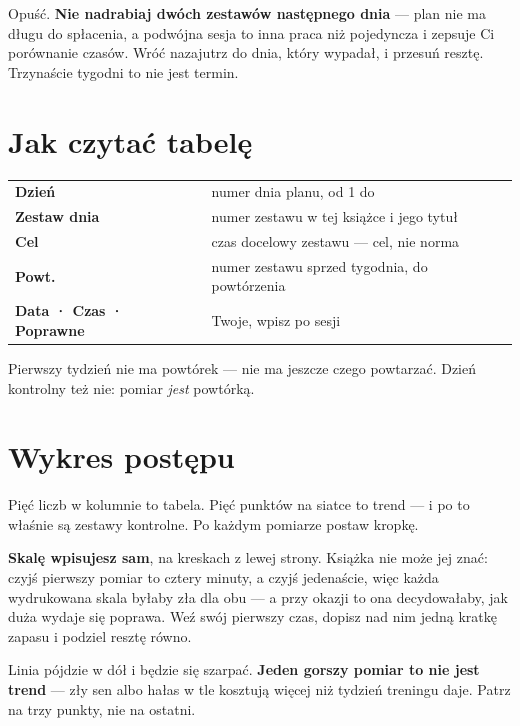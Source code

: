 Opuść. \textbf{Nie nadrabiaj dwóch zestawów następnego dnia} — plan nie ma
długu do spłacenia, a podwójna sesja to inna praca niż pojedyncza i zepsuje
Ci porównanie czasów. Wróć nazajutrz do dnia, który wypadał, i przesuń resztę.
Trzynaście tygodni to nie jest termin.

\section*{Jak czytać tabelę}

\begin{center}\footnotesize
\begin{tabular}{@{}ll@{}}
  \textbf{Dzień} & numer dnia planu, od 1 do \btplandni{} \\
  \textbf{Zestaw dnia} & numer zestawu w tej książce i jego tytuł \\
  \textbf{Cel} & czas docelowy zestawu — cel, nie norma \\
  \textbf{Powt.} & numer zestawu sprzed tygodnia, do powtórzenia \\
  \textbf{Data · Czas · Poprawne} & Twoje, wpisz po sesji \\
\end{tabular}
\end{center}

\noindent
Pierwszy tydzień nie ma powtórek — nie ma jeszcze czego powtarzać. Dzień
kontrolny też nie: pomiar \emph{jest} powtórką.



\section*{Wykres postępu}

Pięć liczb w kolumnie to tabela. Pięć punktów na siatce to trend — i po to
właśnie są zestawy kontrolne. Po każdym pomiarze postaw kropkę.

\textbf{Skalę wpisujesz sam}, na kreskach z lewej strony. Książka nie może jej
znać: czyjś pierwszy pomiar to cztery minuty, a czyjś jedenaście, więc każda
wydrukowana skala byłaby zła dla obu — a przy okazji to ona decydowałaby, jak
duża wydaje się poprawa. Weź swój pierwszy czas, dopisz nad nim jedną kratkę
zapasu i podziel resztę równo.

\smallskip
\noindent
Linia pójdzie w dół i będzie się szarpać. \textbf{Jeden gorszy pomiar to nie
jest trend} — zły sen albo hałas w tle kosztują więcej niż tydzień treningu
daje. Patrz na trzy punkty, nie na ostatni.

\medskip

